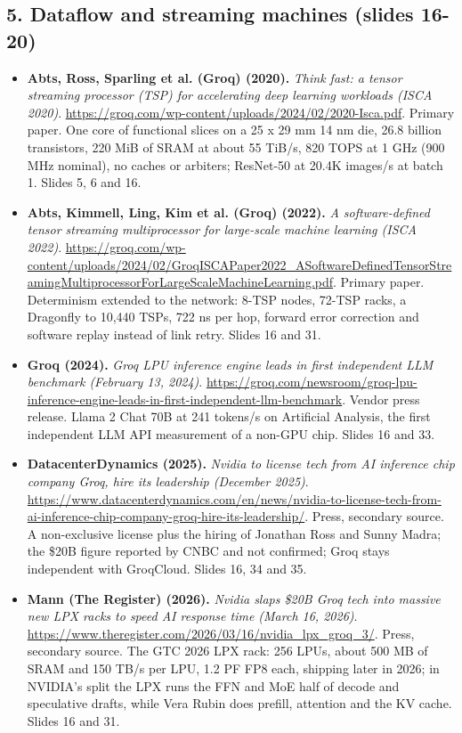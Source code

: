 \subsection*{5. Dataflow and streaming machines (slides 16-20)}
\begin{itemize}[leftmargin=1.2em,itemsep=3pt]\sloppy
\item \textbf{Abts, Ross, Sparling et al. (Groq) (2020).} \textit{Think fast: a tensor streaming processor (TSP) for accelerating deep learning workloads (ISCA 2020)}. \url{https://groq.com/wp-content/uploads/2024/02/2020-Isca.pdf}. Primary paper. One core of functional slices on a 25 x 29 mm 14 nm die, 26.8 billion transistors, 220 MiB of SRAM at about 55 TiB/s, 820 TOPS at 1 GHz (900 MHz nominal), no caches or arbiters; ResNet-50 at 20.4K images/s at batch 1. Slides 5, 6 and 16.
\item \textbf{Abts, Kimmell, Ling, Kim et al. (Groq) (2022).} \textit{A software-defined tensor streaming multiprocessor for large-scale machine learning (ISCA 2022)}. \url{https://groq.com/wp-content/uploads/2024/02/GroqISCAPaper2022_ASoftwareDefinedTensorStreamingMultiprocessorForLargeScaleMachineLearning.pdf}. Primary paper. Determinism extended to the network: 8-TSP nodes, 72-TSP racks, a Dragonfly to 10,440 TSPs, 722 ns per hop, forward error correction and software replay instead of link retry. Slides 16 and 31.
\item \textbf{Groq (2024).} \textit{Groq LPU inference engine leads in first independent LLM benchmark (February 13, 2024)}. \url{https://groq.com/newsroom/groq-lpu-inference-engine-leads-in-first-independent-llm-benchmark}. Vendor press release. Llama 2 Chat 70B at 241 tokens/s on Artificial Analysis, the first independent LLM API measurement of a non-GPU chip. Slides 16 and 33.
\item \textbf{DatacenterDynamics (2025).} \textit{Nvidia to license tech from AI inference chip company Groq, hire its leadership (December 2025)}. \url{https://www.datacenterdynamics.com/en/news/nvidia-to-license-tech-from-ai-inference-chip-company-groq-hire-its-leadership/}. Press, secondary source. A non-exclusive license plus the hiring of Jonathan Ross and Sunny Madra; the \$20B figure reported by CNBC and not confirmed; Groq stays independent with GroqCloud. Slides 16, 34 and 35.
\item \textbf{Mann (The Register) (2026).} \textit{Nvidia slaps \$20B Groq tech into massive new LPX racks to speed AI response time (March 16, 2026)}. \url{https://www.theregister.com/2026/03/16/nvidia_lpx_groq_3/}. Press, secondary source. The GTC 2026 LPX rack: 256 LPUs, about 500 MB of SRAM and 150 TB/s per LPU, 1.2 PF FP8 each, shipping later in 2026; in NVIDIA's split the LPX runs the FFN and MoE half of decode and speculative drafts, while Vera Rubin does prefill, attention and the KV cache. Slides 16 and 31.

\end{itemize}
